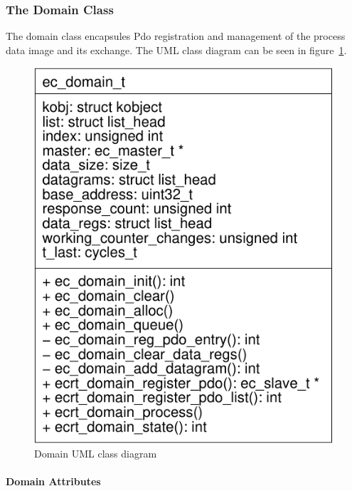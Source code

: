 \documentclass[a4paper,12pt,BCOR6mm,bibtotoc,idxtotoc]{scrbook}
\begin{document}

\subsubsection{The Domain Class}
\label{sec:class-domain}

The domain class encapsules Pdo registration and management of the
process data image and its exchange. The UML class diagram can be seen
in figure~\ref{fig:uml-domain}.

\begin{figure}[htbp]
  \centering
  \includegraphics[width=.4\textwidth]{images/uml-domain}
  \caption{Domain UML class diagram}
  \label{fig:uml-domain}
\end{figure}

\paragraph{Domain Attributes}
\end{document}
